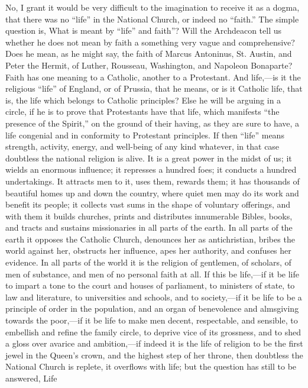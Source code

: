 No, I grant it would be very difficult to the imagination to
receive it as a dogma, that there was no ``life'' in the
National Church, or indeed no ``faith.'' The simple question
is, What is meant by ``life'' and faith''? Will the
Archdeacon tell us whether he does not mean by faith a something very
vague and comprehensive? Does he mean, as he might say, the faith of
Marcus Antoninus, St. Austin, and Peter the Hermit, of Luther,
Rousseau, Washington, and Napoleon Bonaparte? Faith has one meaning to
a Catholic, another to a Protestant. And life,—is it the religious
``life'' of England, or of Prussia, that he means, or is it
Catholic life, that is, the life which belongs to Catholic principles?
Else he will be arguing in a circle, if he is to prove that
Protestants have that life, which manifests ``the presence of the
Spirit,'' on the ground of their having, as they are sure to have,
a life congenial and in conformity to Protestant principles. If then
``life'' means strength, activity, energy, and well-being of
any kind whatever, in that case doubtless the national religion is
alive. It is a great power in the midst of us; it wields an enormous
influence; it represses a hundred foes; it conducts a hundred
undertakings. It attracts men to it, uses them, rewards them; it has
thousands of beautiful homes up and down the country, where quiet men
may do its work and benefit its people; it collects vast sums in the
shape of voluntary offerings, and with them it builds churches, prints
and distributes innumerable Bibles, books, and tracts and sustains
missionaries in all parts of the earth. In all parts of the earth it
opposes the Catholic Church, denounces her as antichristian, bribes
the world against her, obstructs her influence, apes her authority,
and confuses her evidence. In all parts of the world it is the
religion of gentlemen, of scholars, of men of substance, and men of no
personal faith at all. If this be life,—if it be life to impart a
tone to the court and houses of parliament, to ministers of state, to
law and literature, to universities and schools, and to society,—if
it be life to be a principle of order in the population, and an organ
of benevolence and almsgiving towards the poor,—if it be life to
make men decent, respectable, and sensible, to embellish and refine
the family circle, to deprive vice of its grossness, and to shed a
gloss over avarice and ambition,—if indeed it is the life of
religion to be the first jewel in the Queen's crown, and the highest
step of her throne, then doubtless the National Church is replete, it
overflows with life; but the question has still to be answered, Life
